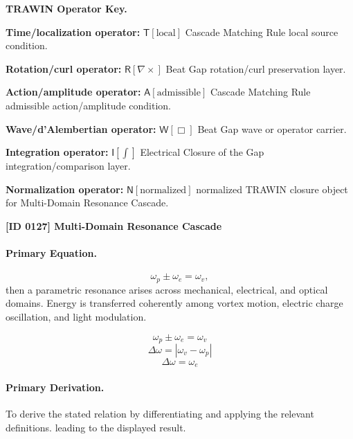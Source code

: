 \par\vspace{0.45\baselineskip}
\noindent\begin{minipage}[t]{\linewidth}
\begingroup
\small
\raggedright
\textbf{TRAWIN Operator Key.}\par
\noindent\textbf{Time/localization operator:} $\mathsf{T}\!\left[\mathrm{local}\right]$ Cascade Matching Rule local source condition.\par
\noindent\textbf{Rotation/curl operator:} $\mathsf{R}\!\left[\nabla\times\right]$ Beat Gap rotation/curl preservation layer.\par
\noindent\textbf{Action/amplitude operator:} $\mathsf{A}\!\left[\mathrm{admissible}\right]$ Cascade Matching Rule admissible action/amplitude condition.\par
\noindent\textbf{Wave/d'Alembertian operator:} $\mathsf{W}\!\left[\Box\right]$ Beat Gap wave or operator carrier.\par
\noindent\textbf{Integration operator:} $\mathsf{I}\!\left[\int\right]$ Electrical Closure of the Gap integration/comparison layer.\par
\noindent\textbf{Normalization operator:} $\mathsf{N}\!\left[\mathrm{normalized}\right]$ normalized TRAWIN closure object for Multi-Domain Resonance Cascade.\par
\endgroup
\end{minipage}

\clearpage
\noindent\textbf{[ID 0127] Multi-Domain Resonance Cascade}\par
\vspace{0.35em}
\paragraph{Primary Equation.}
\[ \omega_p \pm \omega_e = \omega_v, \] then a parametric resonance arises across mechanical, electrical, and optical domains. Energy is transferred coherently among vortex motion, electric charge oscillation, and light modulation.

\[
\omega_p \pm \omega_e = \omega_v
\]
\[
\Delta \omega = |\omega_v - \omega_p|
\]
\[
\Delta \omega = \omega_e
\]

\paragraph{Primary Derivation.}
To derive the stated relation by differentiating and applying the relevant definitions. leading to the displayed result.
